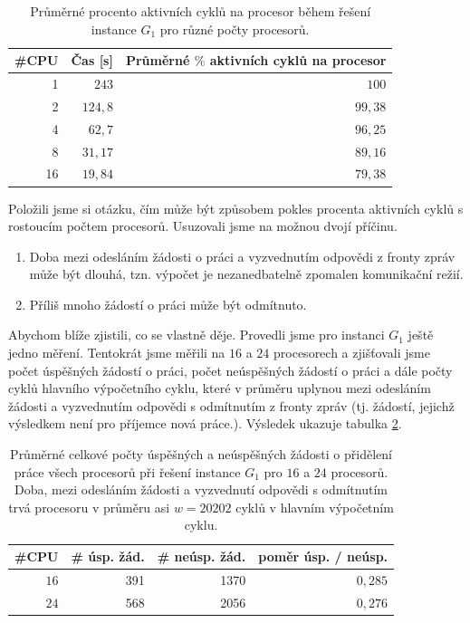 \documentclass[12pt]{article}
\theoremstyle{definition}
\begin{document}
\begin{table}[ht]
	\centering
	\begin{tabular}{r|r|r}
		\#CPU & Čas [s]& Průměrné $\%$ aktivních cyklů na procesor\\
		\hline\hline
		1 & $243$ & $100$\\
		\hline
		2 & $124,8$ & $99,38$\\
		\hline
		4 & $62,7$ & $96,25$\\
		\hline
		
		8 & $31,17$ & $89,16$\\
		\hline
	
		16 & $19,84$ & $79,38$\\	
	\end{tabular}
	\caption{Průměrné procento aktivních cyklů na procesor během řešení instance $G_1$ pro různé počty procesorů.}
	\label{tabAnal}
\end{table}
Položili jsme si otázku, čím může být způsobem pokles procenta aktivních cyklů s rostoucím počtem procesorů.
Usuzovali jsme na možnou dvojí příčinu.
\begin{enumerate}
	\item Doba mezi odesláním žádosti o práci a vyzvednutím odpovědi z fronty zpráv  může být dlouhá, tzn. výpočet je nezanedbatelně zpomalen komunikační
	režií.
	\item Příliš mnoho žádostí o práci může být odmítnuto.
\end{enumerate}
Abychom blíže zjistili, co se vlastně děje. Provedli jsme pro instanci $G_1$ ještě jedno měření. Tentokrát jsme
měřili na $16$ a $24$ procesorech a zjišťovali jsme počet úspěšných žádostí o práci, počet neúspěšných žádostí o práci
a dále počty cyklů hlavního výpočetního cyklu, které v průměru uplynou mezi odesláním žádosti a vyzvednutím odpovědi s odmítnutím
z fronty zpráv (tj. žádostí,
jejichž výsledkem není pro příjemce nová práce.). Výsledek ukazuje tabulka \ref{tabDeep}.
\begin{table}[ht]
	\centering
	\begin{tabular}{r|r|r|r}
		\#CPU & \# úsp. žád. & \# neúsp. žád. & poměr úsp. / neúsp.\\
		\hline\hline
		$16$ & 391 & 1370 & $0,285$\\
		\hline
		$24$ & 568 & 2056 & $0,276$\\
		
	\end{tabular}
	\caption{Průměrné celkové počty úspěšných a neúspěšných žádosti o přidělení práce všech procesorů při řešení instance
		$G_1$ pro $16$ a $24$ procesorů. Doba, mezi odesláním žádosti a vyzvednutí odpovědi s odmítnutím trvá
		procesoru v průměru asi $w=20202$ cyklů v hlavním výpočetním cyklu.}
	\label{tabDeep}
\end{table}
\end{document}
